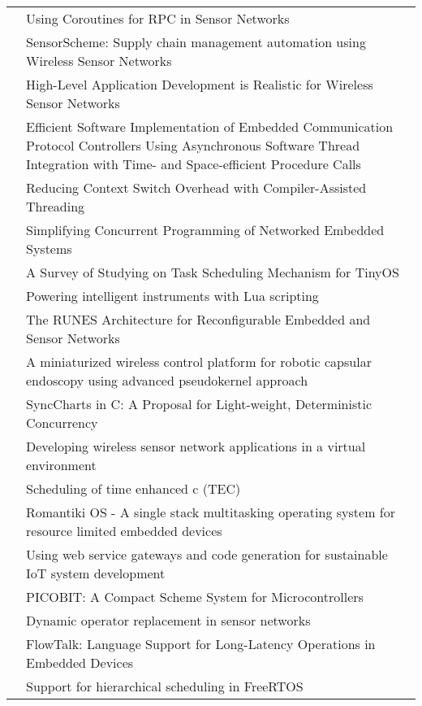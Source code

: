 \begin{longtable}[c]{ l p{8cm} }
 \cite{Cohen2007b} & Using Coroutines for RPC in Sensor Networks \\
\cite{Evers2007} & SensorScheme: Supply chain management automation using Wireless Sensor Networks \\
\cite{Karpin2007} & High-Level Application Development is Realistic for Wireless Sensor Networks \\
\cite{Kumar2007} & Efficient Software Implementation of Embedded Communication Protocol Controllers Using Asynchronous Software Thread Integration with Time- and Space-efficient Procedure Calls \\
\cite{Jaaskelainen2008} & Reducing Context Switch Overhead with Compiler-Assisted Threading \\
\cite{Khezri2008} & Simplifying Concurrent Programming of Networked Embedded Systems \\
\cite{Yu2008} & A Survey of Studying on Task Scheduling Mechanism for TinyOS \\
\cite{Clark2009} & Powering intelligent instruments with Lua scripting \\
\cite{Oldewurtel2009} & The RUNES Architecture for Reconfigurable Embedded and Sensor Networks \\
\cite{Susilo2009} & A miniaturized wireless control platform for robotic capsular endoscopy using advanced pseudokernel approach \\
\cite{VonHanxleden2009} & SyncCharts in C: A Proposal for Light-weight, Deterministic Concurrency \\
\cite{Boers2010} & Developing wireless sensor network applications in a virtual environment \\
\cite{Fritzsche2010} & Scheduling of time enhanced c (TEC) \\
\cite{Glistvain2010} & Romantiki OS - A single stack multitasking operating system for resource limited embedded devices \\
\cite{Riedel2010} & Using web service gateways and code generation for sustainable IoT system development \\
\cite{St-Amour2010} & PICOBIT: A Compact Scheme System for Microcontrollers \\
\cite{Strube2010} & Dynamic operator replacement in sensor networks \\
\cite{Bergel2011} & FlowTalk: Language Support for Long-Latency Operations in Embedded Devices \\
\cite{Inam2011} & Support for hierarchical scheduling in FreeRTOS \\

\end{longtable}
